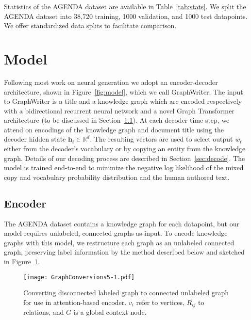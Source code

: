 \documentclass[11pt,a4paper]{article}
\begin{document}
Statistics of the AGENDA dataset are available in Table~\ref{tab:stats}.
We split the AGENDA dataset into 38,720 training, 1000 validation, and 1000 test datapoints.
We offer standardized data splits to facilitate comparison. 



\section{Model}

Following most work on neural generation we adopt an encoder-decoder architecture, shown in Figure~\ref{fig:model}, which we call GraphWriter.
The input to GraphWriter is a title and a knowledge graph which are encoded respectively with a bidirectional recurrent neural network and a novel Graph Transformer architecture (to be discussed in
  Section~\ref{sec:encoder}). 
At each decoder time step, we attend on encodings of the knowledge graph and document title using the decoder hidden state $\mathbf{h}_t \in \mathbb{R}^{d}$.
The resulting vectors are used to select output $w_t$ either from the decoder's vocabulary or by copying an entity from the knowledge graph. 
Details of our decoding process are described in Section~\ref{sec:decode}.
The model is trained end-to-end to minimize the negative log likelihood of the mixed copy and vocabulary probability distribution and the human authored text. 


\subsection{Encoder}\label{sec:encoder}

The AGENDA dataset contains a knowledge graph for each datapoint, but our model requires unlabeled, connected graphs as input. 
To encode knowledge graphs with this model, we restructure each graph as an unlabeled connected graph, preserving label information by the method described below and sketched in Figure~\ref{fig:graph}. 

\begin{figure}[t]
    \centering
    \texttt{[image: GraphConversions5-1.pdf]}
    \caption{Converting disconnected labeled graph to connected unlabeled graph for use in attention-based encoder. $v_i$ refer to vertices, $R_{ij}$ to relations, and $G$ is a global context node.}
    \label{fig:graph}
\end{figure}
\end{document}
